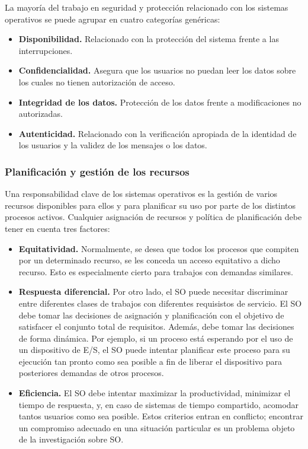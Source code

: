 \documentclass{article}
\begin{document}
				La mayoría del trabajo en seguridad y protección relacionado con los sistemas operativos se puede agrupar en cuatro categorías genéricas:
				
				\begin{itemize}
				\item \textbf{Disponibilidad.} Relacionado con la protección del sistema frente a las interrupciones.
				\item \textbf{Confidencialidad.} Asegura que los usuarios no puedan leer los datos sobre los cuales no tienen autorización de acceso.
				\item \textbf{Integridad de los datos.} Protección de los datos frente a modificaciones no autorizadas.
				\item \textbf{Autenticidad.} Relacionado con la verificación apropiada de la identidad de los usuarios y la validez de los mensajes o los datos.
				\end{itemize}
				
			\subsubsection{Planificación y gestión de los recursos}
				Una responsabilidad clave de los sistemas operativos es la gestión de varios recursos disponibles para ellos y para planificar su uso por parte de los distintos procesos activos. Cualquier asignación de recursos y política de planificación debe tener en cuenta tres factores:
				
				\begin{itemize}	
				\item \textbf{Equitatividad.} Normalmente, se desea que todos los procesos que compiten por un determinado recurso, se les conceda un acceso equitativo a dicho recurso. Esto es especialmente cierto para trabajos con demandas similares.
				\item \textbf{Respuesta diferencial.} Por otro lado, el SO puede necesitar discriminar entre diferentes clases de trabajos con diferentes requisistos de servicio. El SO debe tomar las decisiones de asignación y planificación con el objetivo de satisfacer el conjunto total de requisitos. Además, debe tomar las decisiones de forma dinámica. Por ejemplo, si un proceso está esperando por el uso de un dispositivo de E/S, el SO puede intentar planificar este proceso para su ejecución tan pronto como sea posible a fin de liberar el dispositivo para posteriores demandas de otros procesos.
				\item \textbf{Eficiencia.} El SO debe intentar maximizar la productividad, minimizar el tiempo de respuesta, y, en caso de sistemas de tiempo compartido, acomodar tantos usuarios como sea posible. Estos criterios entran en conflicto; encontrar un compromiso adecuado en una situación particular es un problema objeto de la investigación sobre SO.
				\end{itemize}											
					
\end{document}
